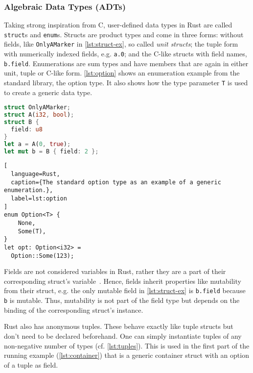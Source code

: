 \subsubsection{Algebraic Data Types (ADTs)}

Taking strong inspiration from C, user-defined data types in Rust are called
\lstinline!struct!s and \lstinline!enum!s. Structs are product types and come in
three forms: without fields, like \lstinline!OnlyAMarker! in
\autoref{lst:struct-ex}, so called \emph{unit structs}; the tuple form with
numerically indexed fields, e.g. \lstinline!a.0!; and the C-like structs with
field names, \lstinline!b.field!. Enumerations are sum types and have members
that are again in either unit, tuple or C-like form. \autoref{lst:option} shows
an enumeration example from the standard library, the option type. It also shows
how the type parameter \lstinline!T! is used to create a generic data type.

\noindent\begin{minipage}[t]{.45\textwidth}
\begin{lstlisting}[language=Rust, caption={All three forms of structs.}, label=lst:struct-ex]
struct OnlyAMarker;
struct A(i32, bool);
struct B {
  field: u8
}
let a = A(0, true);
let mut b = B { field: 2 };
\end{lstlisting}
\end{minipage}\hfill
\begin{minipage}[t]{.45\textwidth}
\begin{lstlisting}[
  language=Rust,
  caption={The standard option type as an example of a generic enumeration.},
  label=lst:option
]
enum Option<T> {
    None,
    Some(T),
}
let opt: Option<i32> =
  Option::Some(123);
\end{lstlisting}
\end{minipage}

Fields are not considered variables in Rust, rather they are a part of their
corresponding struct's variable~\cite{rustref}. Hence, fields inherit properties
like mutability from their struct, e.g. the only mutable field in
\autoref{lst:struct-ex} is \lstinline!b.field! because \lstinline!b! is mutable.
Thus, mutability is not part of the field type but depends on the binding of the
corresponding struct's instance.

Rust also has anonymous tuples. These behave exactly like tuple structs but
don't need to be declared beforehand. One can simply instantiate tuples of any
non-negative number of types (cf. \autoref{lst:tuples}). This is used in the
first part of the running example (\autoref{lst:container}) that is a generic
container struct with an option of a tuple as field.

